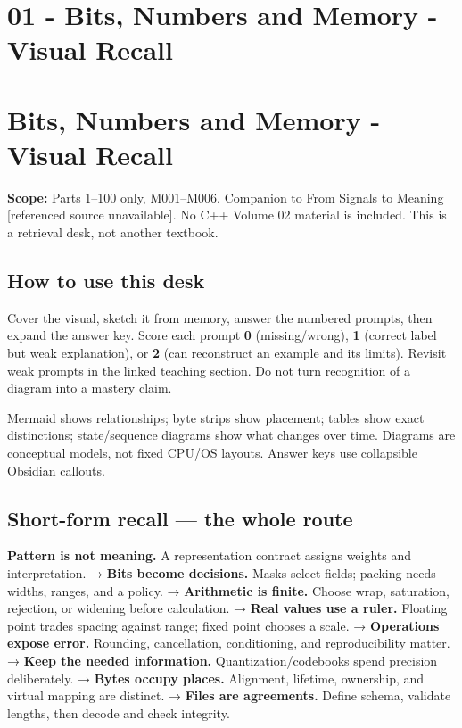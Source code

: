 \hypertarget{appendix-ef4d27797a92}{}
\section*{01 - Bits, Numbers and Memory - Visual Recall}
\section{Bits, Numbers and Memory - Visual Recall}\label{appendix-ef4d27797a92-bits-numbers-and-memory---visual-recall}

\textbf{Scope:} Parts 1--100 only, M001--M006. Companion to {From Signals to Meaning {[}referenced source unavailable{]}}. No C++ Volume 02 material is included. This is a retrieval desk, not another textbook.

\subsection{How to use this desk}\label{appendix-ef4d27797a92-how-to-use-this-desk}

Cover the visual, sketch it from memory, answer the numbered prompts, then expand the answer key. Score each prompt \textbf{0} (missing/wrong), \textbf{1} (correct label but weak explanation), or \textbf{2} (can reconstruct an example and its limits). Revisit weak prompts in the linked teaching section. Do not turn recognition of a diagram into a mastery claim.

Mermaid shows relationships; byte strips show placement; tables show exact distinctions; state/sequence diagrams show what changes over time. Diagrams are conceptual models, not fixed CPU/OS layouts. Answer keys use collapsible Obsidian callouts.

\subsection{Short-form recall --- the whole route}\label{appendix-ef4d27797a92-short-form-recall-the-whole-route}

\textbf{Pattern is not meaning.} A representation contract assigns weights and interpretation. → \textbf{Bits become decisions.} Masks select fields; packing needs widths, ranges, and a policy. → \textbf{Arithmetic is finite.} Choose wrap, saturation, rejection, or widening before calculation. → \textbf{Real values use a ruler.} Floating point trades spacing against range; fixed point chooses a scale. → \textbf{Operations expose error.} Rounding, cancellation, conditioning, and reproducibility matter. → \textbf{Keep the needed information.} Quantization/codebooks spend precision deliberately. → \textbf{Bytes occupy places.} Alignment, lifetime, ownership, and virtual mapping are distinct. → \textbf{Files are agreements.} Define schema, validate lengths, then decode and check integrity.

